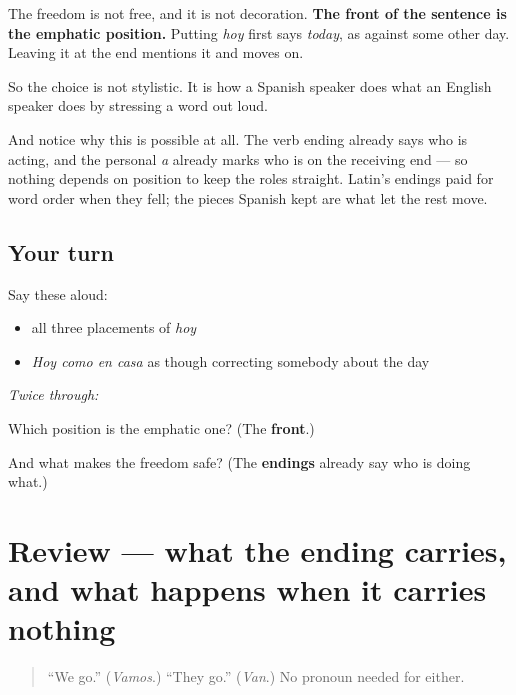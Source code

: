 \begin{culture}
The freedom is not free, and it is not decoration. \textbf{The front of the sentence is the emphatic position.} Putting \emph{hoy} first says \emph{today}, as against some other day. Leaving it at the end mentions it and moves on.

So the choice is not stylistic. It is how a Spanish speaker does what an English speaker does by stressing a word out loud.

And notice why this is possible at all. The verb ending already says who is acting, and the personal \emph{a} already marks who is on the receiving end — so nothing depends on position to keep the roles straight. Latin's endings paid for word order when they fell; the pieces Spanish kept are what let the rest move.
\end{culture}

\subsection*{Your turn}
Say these aloud:

\begin{itemize}
\raggedright
  \item all three placements of \emph{hoy}
  \item \emph{Hoy como en casa} as though correcting somebody about the day
\end{itemize}

\emph{Twice through:}

\begin{tcolorbox}[breakable,colback=teal!4,colframe=teal!35!black,title={Before you move on}]
Which position is the emphatic one? (The \textbf{front}.)

And what makes the freedom safe? (The \textbf{endings} already say who is doing what.)
\end{tcolorbox}
\section[(review)]{Review — what the ending carries, and what happens when it carries nothing}

\label{lesson:ES-C67-repaso-la-terminacion-y-el-infinitivo}



\begin{quote}
\textquotedblleft{}We go.\textquotedblright{} (\emph{Vamos}.) \textquotedblleft{}They go.\textquotedblright{} (\emph{Van}.) No pronoun needed for either.
\end{quote}

